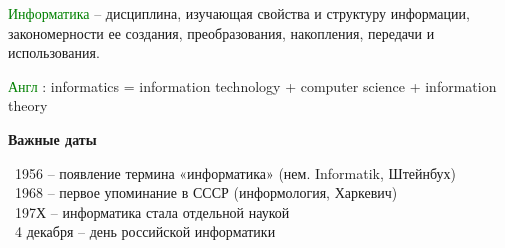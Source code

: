 \newpage
\rhead{\textbf{\textcolor{blue}{О}\textcolor{gray}{пределение термина «информатика» }}}
\vspace*{4mm}
\newline
\textcolor{Green}{Информатика}
– дисциплина, изучающая свойства и структуру информации,
закономерности ее создания, преобразования, накопления, передачи и
использования.

\vspace*{1mm}
\textcolor{Green}{Англ}
: informatics = information technology + computer science + information
theory

\vspace*{2mm}
\begin{center}
  \textbf{Важные даты}
\end{center}
			\textbullet \ 1956 – появление термина «информатика» (нем. Informatik, Штейнбух) \\
			\textbullet \ 1968 – первое упоминание в СССР (информология, Харкевич) \\
			\textbullet \ 197Х – информатика стала отдельной наукой \\
			\textbullet \ 4 декабря – день российской информатики